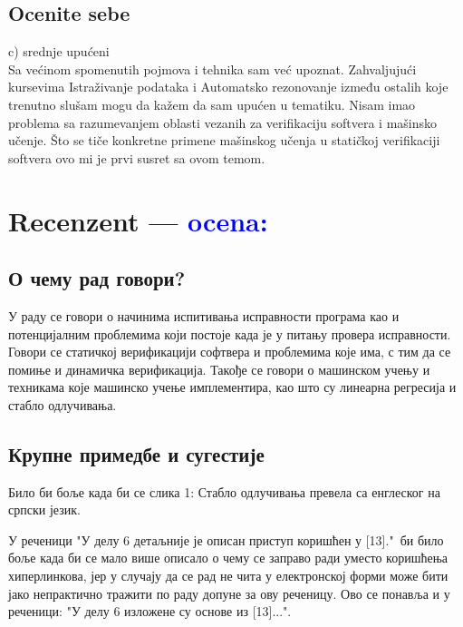 \documentclass[a4paper]{report}
\newcommand{\odgovor}[1]{\textcolor{blue}{#1}}
\begin{document}
\section{Ocenite sebe}
c) srednje upućeni
\\
Sa većinom spomenutih pojmova i tehnika sam već upoznat. Zahvaljujući kursevima Istraživanje podataka i Automatsko rezonovanje između ostalih koje trenutno slušam mogu da kažem da sam upućen u tematiku. Nisam imao problema sa razumevanjem oblasti vezanih za verifikaciju softvera i mašinsko učenje. Što se tiče konkretne primene mašinskog učenja u statičkoj verifikaciji softvera ovo mi je prvi susret sa ovom temom.

\chapter{Recenzent \odgovor{--- ocena:} }


\section{О чему рад говори?}
У раду се говори о начинима испитивања исправности програма као и потенцијалним проблемима који постоје када је у питању провера исправности. Говори се статичкој верификацији софтвера и проблемима које има, с тим да се помиње и динамичка верификација. Такође се говори о машинском учењу и техникама које машинско учење имплементира, као што су линеарна регресија и стабло одлучивања. 

\section{Крупне примедбе и сугестије}
Било би боље када би се слика 1: Стабло одлучивања превела са енглеског на српски језик.

У реченици "У делу 6 детаљније је описан приступ коришћен у [13]."\ би било боље када би се мало више описало о чему се заправо ради уместо коришћења хиперлинкова, јер у случају да се рад не чита у електронској форми може бити јако непрактично тражити по раду допуне за ову реченицу. Ово се понавља и у реченици: "У делу 6 изложене су основе из [13]...".
\end{document}
